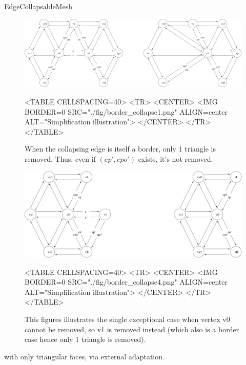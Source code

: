 \begin{ccRefConcept}{EdgeCollapsableMesh}
\begin{figure}[htbp]
\begin{ccTexOnly}
\begin{center}
\includegraphics[width=17cm]{Surface_mesh_simplification_ref/fig/border_collapse1} %
\end{center}
\end{ccTexOnly}
\begin{ccHtmlOnly}
<TABLE CELLSPACING=40>
<TR>
<CENTER>
<IMG BORDER=0 SRC="./fig/border_collapse1.png" ALIGN=center ALT="Simplification illustration">
</CENTER>
</TR>
</TABLE>
\end{ccHtmlOnly}
\caption{When the collapsing edge is itself a border, only 1 triangle is removed. Thus, even if $(ep',epo')$ exists, it's not removed.}
\end{figure}

\begin{figure}[htbp]
\begin{ccTexOnly}
\begin{center}
\includegraphics[width=17cm]{Surface_mesh_simplification_ref/fig/border_collapse4} %
\end{center}
\end{ccTexOnly}
\begin{ccHtmlOnly}
<TABLE CELLSPACING=40>
<TR>
<CENTER>
<IMG BORDER=0 SRC="./fig/border_collapse4.png" ALIGN=center ALT="Simplification illustration">
</CENTER>
</TR>
</TABLE>
\end{ccHtmlOnly}
\caption{This figures illustrates the single exceptional case when vertex v0 cannot be removed, so v1 is removed instead (which also is a border case hence only 1 triangle is removed).}
\end{figure}

\ccHasModels
{} with only triangular faces, via external adaptation.

\ccSeeAlso
{}\\

\end{ccRefConcept}

